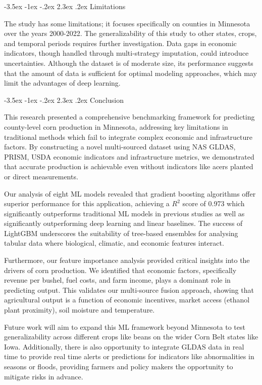 \documentclass[10pt,twocolumn]{article}
\makeatletter
\renewcommand\section{\@startsection{section}{1}{\z@}%
  {-3.5ex \@plus -1ex \@minus -.2ex}%
  {2.3ex \@plus.2ex}%
  {\normalfont\large\bfseries}}
\makeatother
\begin{document}
\section{Limitations}

The study has some limitations; it focuses specifically on counties in Minnesota over the years 2000-2022.
The generalizability of this study to other states, crops, and temporal periods requires further investigation.
Data gaps in economic indicators, though handled through multi-strategy imputation, could introduce uncertainties.
Although the dataset is of moderate size, its performance suggests that the amount of data is sufficient for optimal modeling approaches, which may limit the advantages of deep learning.

\section{Conclusion}

This research presented a comprehensive benchmarking framework for predicting county-level corn production in Minnesota, addressing key limitations in traditional methods which fail to integrate complex economic and infrastructure factors.
By constructing a novel multi-sourced dataset using NAS GLDAS, PRISM, USDA economic indicators and infrastructure metrics, we demonstrated that accurate production is achievable even without indicators like acers planted or direct measurements.

Our analysis of eight ML models revealed that gradient boosting algorithms offer superior performance for this application, achieving a \(R^2\) score of \num{0.973} which significantly outperforms traditional ML models in previous studies as well as significantly outperforming deep learning and linear baselines.
The success of LightGBM underscores the suitability of tree-based ensembles for analysing tabular data where biological, climatic, and economic features interact.

Furthermore, our feature importance analysis provided critical insights into the drivers of corn production.
We identified that economic factors, specifically revenue per bushel, fuel costs, and farm income, plays a dominant role in predicting output.
This validates our multi-source fusion approach, showing that agricultural output is a function of economic incentives, market access (ethanol plant proximity), soil moisture and temperature.

Future work will aim to expand this ML framework beyond Minnesota to test generalizability across different crops like beans on the wider Corn Belt states like Iowa.
Additionally, there is also opportunity to integrate GLDAS data in real time to provide real time alerts or predictions for indicators like abnormalities in seasons or floods, providing farmers and policy makers the opportunity to mitigate risks in advance.
\end{document}
